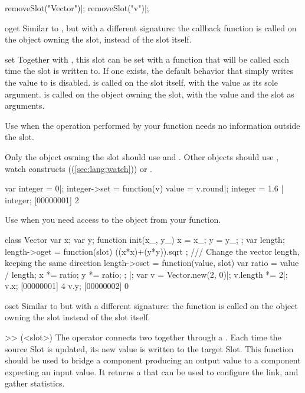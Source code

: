 \begin{urbiscriptapi}
\begin{urbicomment}
removeSlot("Vector")|;
removeSlot("v")|;
\end{urbicomment}

\item[oget]%
  Similar to , but with a different signature: the callback
  function is called on the object owning the slot, instead of the slot
  itself.

\item[set]%
  Together with , this slot can be set with a function that will
  be called each time the
  slot is written to. If one exists, the default behavior that simply writes
  the value to  is disabled.
   is called on the slot itself, with the value as its sole
  argument.  is called on the object owning the slot, with
  the value and the slot as arguments.

  Use  when the operation performed by your function needs no
  information outside the slot.

  Only the object owning the slot should use  and .
  Other objects should use , watch constructs
  ((\autoref{sec:lang:watch})) or .

\begin{urbiscript}
var integer = 0|;
integer->set = function(v) { value = v.round}|;
integer = 1.6 | integer;
[00000001] 2
\end{urbiscript}

  Use  when you need access to the object from your function.

\begin{urbiscript}
class Vector
{
  var x;
  var y;
  function init(x_, y_)
  {
    x = x_;
    y = y_;
  };
  var length;
  length->oget = function(slot) { ((x*x)+(y*y)).sqrt };
  /// Change the vector length, keeping the same direction
  length->oset = function(value, slot)
  {
    var ratio = value / length;
    x *= ratio;
    y *= ratio;
  };
}|;
var v = Vector.new(2, 0)|;
v.length *= 2|;
v.x;
[00000001] 4
v.y;
[00000002] 0
\end{urbiscript}

\item[oset]%
  Similar to  but with a different signature: the function is
  called on the object owning the slot instead of the slot itself.

\item[>>](<slot>)%
  The  operator connects two  together through a
  . Each time the source Slot is updated, its new value
  is written to the target Slot.
  This function should be used to bridge a component producing an output value
  to a component expecting an input value.
  It returns a  that can be used to configure the link,
  and gather statistics.


\end{urbiscriptapi}

